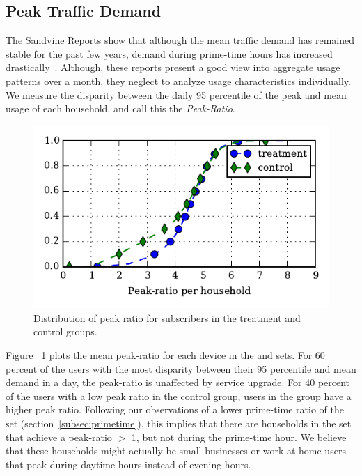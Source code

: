 \subsection{Peak Traffic Demand}\label{subsec:peakratio}

The Sandvine Reports show that although the mean traffic demand has remained
stable for the past few years, demand during prime-time hours has increased
drastically~\cite{sandvine20141h}. Although, these reports present a good view 
into aggregate usage 
patterns over a month, they neglect to analyze usage characteristics 
individually. 
We measure the disparity between the daily 95 percentile of the peak and 
mean usage of each household, and call this the \emph{Peak-Ratio}.

\begin{figure}[t]
\begin{minipage}{1\linewidth}
\centering
\includegraphics[width=1\linewidth]{figures/peakratio-CDF-devices-MEAN.pdf}
\caption{Distribution of peak ratio for subscribers in the treatment and 
control groups.}
\label{fig:CDF-peak-ratio-mean}
\end{minipage}
\end{figure}

Figure ~\ref{fig:CDF-peak-ratio-mean} plots the mean peak-ratio for each 
device in the \treatment{} and \control{} sets.
For 60 percent of the users with the most disparity between their
95 percentile and mean demand in a day, the peak-ratio is unaffected by
service upgrade. For 40 percent of the users with a low peak ratio in the 
control
group, users in the \treatment{} group have a higher peak ratio.
Following our observations of a lower prime-time ratio of the  
\treatment{} set (section~\ref{subsec:primetime}), this implies that there are 
households in the \test set that achieve a peak-ratio $>$ 1, but not during the 
prime-time hour. We believe that these households might actually be small 
businesses or work-at-home users that peak during daytime hours instead of 
evening hours.